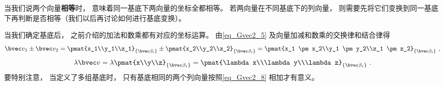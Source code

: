 当我们说两个向量\textbf{相等}时， 意味着同一基底下两向量的坐标全都相等。 若两向量在不同基底下的列向量， 则需要先将它们变换到同一基底下再判断是否相等（我们以后再讨论如何进行基底变换）。

当我们确定基底后， 之前介绍的加法和数乘都有对应的坐标运算。 由\autoref{eq_Gvec2_5} 及向量加减和数乘的交换律和结合律得
\begin{equation}\label{eq_Gvec2_8}
\bvec v_1 \pm \bvec v_2 = \pmat{x_1\\y_1\\z_1}_{\{\bvec\beta_i\}} \pm \pmat{x_2\\y_2\\z_2}_{\{\bvec\beta_i\}} = \pmat{x_1 \pm x_2\\y_1 \pm y_2\\z_1 \pm z_2}_{\{\bvec\beta_i\}}~,
\end{equation}
\begin{equation}\label{eq_Gvec2_9}
\lambda \bvec v = \lambda\pmat{x\\y\\z}_{\{\bvec\beta_i\}} = \pmat{\lambda x\\\lambda y\\\lambda z}_{\{\bvec\beta_i\}}~.
\end{equation}
要特别注意， 当定义了多组基底时， 只有基底相同的两个列向量按照\autoref{eq_Gvec2_8} 相加才有意义。
